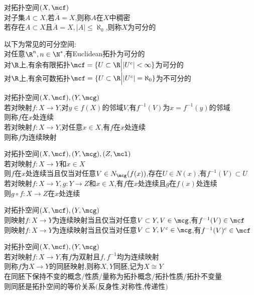 \begin{dingyi}
对拓扑空间$(X,\mcf)$\\
对子集$A\subset X$,若$\overline{A}=X$,则称$A$在$X$中稠密\\
若存在$A\subset X$且$\overline{A}=X,|A|\leq \aleph_0$,则称$X$为可分的
\end{dingyi}

\begin{zhu}
以下为常见的可分空间:\\
对任意$\R^n,n\in\N^*$,有Euclidean拓扑为可分的\\
对$\R$上,有余有限拓扑$\mcf=\{U\subset \R\Big||U^{c}|<\infty\}$为可分的\\
对$\R$上,有余可数拓扑$\mcf=\{U\subset \R\Big||U^{c}|=\aleph_0\}$为不可分的
\end{zhu}

\begin{dingyi}
对拓扑空间$(X,\mcf),(Y,\mcg)$\\
若对映射$f:X\to Y$,对$y\in f(X)$的邻域$V$,有$f^{-1}(V)$为$x=f^{-1}(y)$的邻域\\
则称$f$在$x$处连续\\
若对映射$f:X\to Y$,对任意$x\in X$,有$f$在$x$处连续\\
则称$f$为连续映射
\end{dingyi}

\begin{dingli}
对拓扑空间$(X,\mcf),(Y,\mcg),(Z,\mcl)$\\
若对映射$f:X\to Y$和$x\in X$\\
则$f$在$x$处连续当且仅当对任意$V\in N_{\mcg}(f(x))$,存在$U\in N(x)$,有$f^{-1}(V)\subset U$\\
若对映射$f:X\to Y,g:Y\to Z$和$x\in X$,有$f$在$x$处连续且$g$在$f(x)$处连续\\
则$g\circ f:X\to Z$在$x$处连续
\end{dingli}

\begin{dingli}
对拓扑空间$(X,\mcf),(Y,\mcg)$\\
则映射$f:X\to Y$为连续映射当且仅当对任意$V\subset Y,V\in \mcg$,有$f^{-1}(V)\in \mcf$\\
则映射$f:X\to Y$为连续映射当且仅当对任意$V\subset Y,V^{c}\in \mcg$,有$f^{-1}(V)^{c}\in \mcf$
\end{dingli}

\begin{dingli}
对拓扑空间$(X,\mcf),(Y,\mcg)$\\
若对映射$f:X\to Y$,有$f$为双射且$f,f^{-1}$均为连续映射\\
则称$f$为$X\to Y$的同胚映射,则称$X,Y$同胚,记为$X\cong Y$\\
在同胚下保持不变的概念/性质/量称为拓扑概念/拓扑性质/拓扑不变量\\
则同胚是拓扑空间的等价关系$($反身性,对称性,传递性$)$
\end{dingli}

